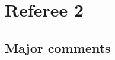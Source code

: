 \documentclass[a4paper,11pt]{texMemo}
\begin{document}
\section*{Referee 2}


%

\subsection*{Major comments}
\end{document}
